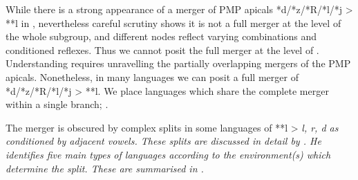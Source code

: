While there is a strong appearance of a merger of PMP apicals
*d/*z/*R/*l/*j > **l in ,
nevertheless careful scrutiny shows it is not a full merger at
the level of the whole subgroup,
and different nodes reflect varying combinations and conditioned reflexes.
Thus we cannot posit the full merger at the level of .
Understanding  requires unravelling the partially
overlapping mergers of the PMP apicals.
Nonetheless, in many languages we can posit a full merger of *d/*z/*R/*l/*j > **l.
We place languages which share the complete merger within a single
branch; .

\newpage
The merger is obscured by complex splits in
some languages of **l > \it{l,
r, d} as conditioned by adjacent vowels.
These splits are discussed in detail by \citet[23--33]{Stresemann1927}.
He identifies five main types of languages according to the environment(s)
which determine the split.
These are summarised in .

